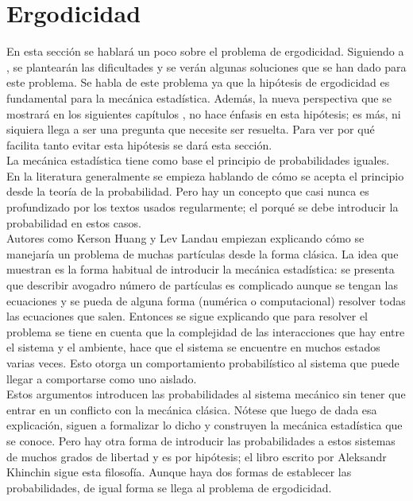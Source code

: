 \section{Ergodicidad}
En esta sección se hablará un poco sobre el problema de ergodicidad. Siguiendo a \cite{TodaStat}, se plantearán las dificultades y se verán algunas soluciones que se han dado para este problema. Se habla de este problema ya que la hipótesis de ergodicidad es fundamental para la mecánica estadística. Además, la nueva perspectiva que se mostrará en los siguientes capítulos \cite{Popescu2006}, no hace énfasis en esta hipótesis; es más, ni siquiera llega a ser una pregunta que necesite ser resuelta. Para ver por qué facilita tanto evitar esta hipótesis se dará esta sección.
\\
La mecánica estadística tiene como base el principio de probabilidades iguales. En la literatura generalmente se empieza hablando de cómo se acepta el principio desde la teoría de la probabilidad. Pero hay un concepto que casi nunca es profundizado por los textos usados regularmente; el porqué se debe introducir la probabilidad en estos casos.\\
Autores como Kerson Huang y Lev Landau empiezan explicando cómo se manejaría un problema de muchas partículas desde la forma clásica. La idea que muestran es la forma habitual de introducir la mecánica estadística: se presenta que describir avogadro número de partículas es complicado aunque se tengan las ecuaciones y se pueda de alguna forma (numérica o computacional) resolver todas las ecuaciones que salen. Entonces se sigue explicando que para resolver el problema se tiene en cuenta que la complejidad de las interacciones que hay entre el sistema y el ambiente, hace que el sistema se encuentre en muchos estados varias veces. Esto otorga un comportamiento probabilístico al sistema que puede llegar a comportarse como uno aislado.
\\ 
Estos argumentos introducen las probabilidades al sistema mecánico sin tener que entrar en un conflicto con la mecánica clásica. Nótese que luego de dada esa explicación, siguen a formalizar lo dicho y construyen la mecánica estadística que se conoce. Pero hay otra forma de introducir las probabilidades a estos sistemas de muchos grados de libertad y es por hipótesis; el libro escrito por Aleksandr Khinchin \cite{KhinchinStat} sigue esta filosofía. Aunque haya dos formas de establecer las probabilidades, de igual forma se llega al problema de ergodicidad. 
\\
